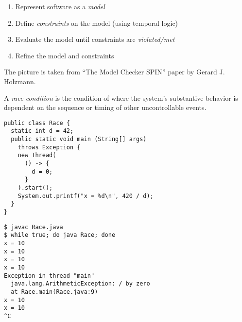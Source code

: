 \documentclass{article}
\begin{document}
\begin{enumerate}
\item Represent software as a \emph{model}
\item Define \emph{constraints} on the model (using temporal logic)
\item Evaluate the model until constraints are \emph{violated/met}
\item Refine the model and constraints
\end{enumerate}

\plush{}



{\scriptsize The picture is taken from ``The Model Checker SPIN'' paper by Gerard J. Holzmann.}

\plush{}



\plush{}



A \emph{race condition} is the condition of where the system's substantive behavior is dependent on the sequence
or timing of other uncontrollable events.

\begin{pptWide}{2}
{\scriptsize\begin{verbatim}
public class Race {
  static int d = 42;
  public static void main (String[] args)
    throws Exception {
    new Thread(
      () -> {
        d = 0;
      }
    ).start();
    System.out.printf("x = %d\n", 420 / d);
  }
}
\end{verbatim}
}
\par\columnbreak\par
{\scriptsize\begin{verbatim}
$ javac Race.java
$ while true; do java Race; done
x = 10
x = 10
x = 10
x = 10
Exception in thread "main"
  java.lang.ArithmeticException: / by zero
  at Race.main(Race.java:9)
x = 10
x = 10
^C
\end{verbatim}
}
\end{pptWide}
\plush{}

\end{document}
